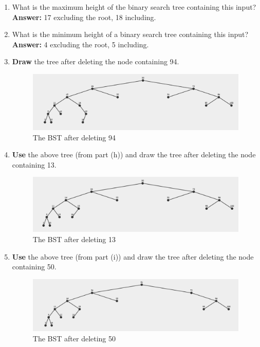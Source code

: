 \documentclass[12pt, a4paper]{article}
\newcommand{\squeezeup}{\vspace{-16pt}}%
\begin{document}
\begin{enumerate}
\begin{enumerate}
        \item What is the maximum height of the binary search tree containing this input? \\
        \hspace*{\fill} \textbf{Answer:} 17 excluding the root, 18 including.

        \item What is the minimum height of a binary search tree containing this input? \\
        \hspace*{\fill} \textbf{Answer:} 4 excluding the root, 5 including.

        \item \textbf{Draw} the tree after deleting the node containing 94.
        \begin{figure}[H]
            \includegraphics[max width=\textwidth/2, center]{"6(h).png"}
            \caption{The BST after deleting 94}
            \label{fig:6(h)-BST}
        \end{figure}\squeezeup

        \item \textbf{Use} the above tree (from part (h)) and draw the tree after deleting the node containing 13.
        \begin{figure}[H]
            \includegraphics[max width=\textwidth/2, center]{"6(i).png"}
            \caption{The BST after deleting 13}
            \label{fig:6(i)-BST}
        \end{figure}\squeezeup

        \item \textbf{Use} the above tree (from part (i)) and draw the tree after deleting the node containing 50.
        \begin{figure}[H]
            \includegraphics[max width=\textwidth/2, center]{"6(j).png"}
            \caption{The BST after deleting 50}
            \label{fig:6(j)-BST}
        \end{figure}\squeezeup


\end{enumerate}
\end{enumerate}
\end{document}
